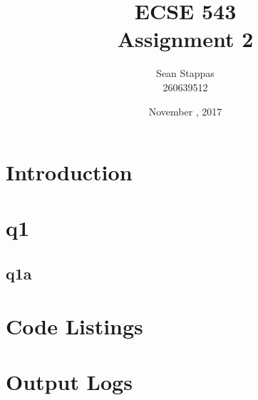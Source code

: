 \documentclass[a4paper,titlepage]{article}
\title{\textbf{ECSE 543 \\ Assignment 2}}
\author{Sean Stappas \\ 260639512}
\date{November \nth{13}, 2017}
\begin{document}
	\sloppy
	\maketitle
	
	\tableofcontents
	
	
	\twocolumn
	
	\section*{Introduction}
	
	\section{q1}
	
	\subsection{q1a}
	
%
	
	\onecolumn
	
	\begin{appendices}
		
		\section{Code Listings} \label{appendix:code}
		
		
		
		\section{Output Logs} \label{appendix:logs}
		

	\end{appendices}
\end{document}
